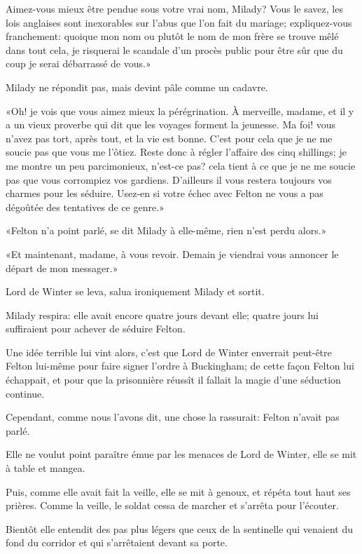 \speak  Aimez-vous mieux être pendue sous votre vrai nom, Milady? Vous le savez, les lois anglaises sont inexorables sur l'abus que l'on fait du mariage; expliquez-vous franchement: quoique mon nom ou plutôt le nom de mon frère se trouve mêlé dans tout cela, je risquerai le scandale d'un procès public pour être sûr que du coup je serai débarrassé de vous.» 

Milady ne répondit pas, mais devint pâle comme un cadavre. 

«Oh! je vois que vous aimez mieux la pérégrination. À merveille, madame, et il y a un vieux proverbe qui dit que les voyages forment la jeunesse. Ma foi! vous n'avez pas tort, après tout, et la vie est bonne. C'est pour cela que je ne me soucie pas que vous me l'ôtiez. Reste donc à régler l'affaire des cinq shillings; je me montre un peu parcimonieux, n'est-ce pas? cela tient à ce que je ne me soucie pas que vous corrompiez vos gardiens. D'ailleurs il vous restera toujours vos charmes pour les séduire. Usez-en si votre échec avec Felton ne vous a pas dégoûtée des tentatives de ce genre.» 

«Felton n'a point parlé, se dit Milady à elle-même, rien n'est perdu alors.» 

«Et maintenant, madame, à vous revoir. Demain je viendrai vous annoncer le départ de mon messager.» 

Lord de Winter se leva, salua ironiquement Milady et sortit. 

Milady respira: elle avait encore quatre jours devant elle; quatre jours lui suffiraient pour achever de séduire Felton. 

Une idée terrible lui vint alors, c'est que Lord de Winter enverrait peut-être Felton lui-même pour faire signer l'ordre à Buckingham; de cette façon Felton lui échappait, et pour que la prisonnière réussît il fallait la magie d'une séduction continue. 

Cependant, comme nous l'avons dit, une chose la rassurait: Felton n'avait pas parlé. 

Elle ne voulut point paraître émue par les menaces de Lord de Winter, elle se mit à table et mangea. 

Puis, comme elle avait fait la veille, elle se mit à genoux, et répéta tout haut ses prières. Comme la veille, le soldat cessa de marcher et s'arrêta pour l'écouter. 

Bientôt elle entendit des pas plus légers que ceux de la sentinelle qui venaient du fond du corridor et qui s'arrêtaient devant sa porte. 


